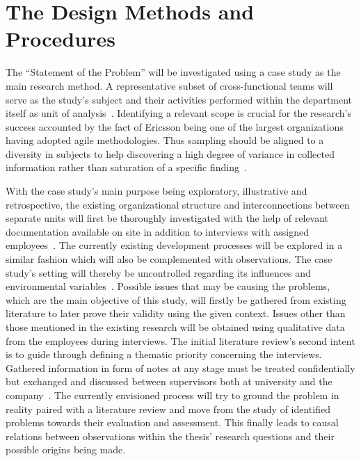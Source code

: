 \documentclass[paper=a4, fontsize=11pt]{scrartcl}
\numberwithin{equation}{section}		%
\numberwithin{figure}{section}			%
\numberwithin{table}{section}			%
\newcommand{\quotes}[1]{``#1''}
\begin{document}
\section{The Design \textemdash Methods and Procedures}

The \quotes{Statement of the Problem} will be investigated using a case study as the main research method. A representative subset of cross-functional teams will serve as the study's subject and their activities performed within the department itself as unit of analysis~\citep{thomas2011casestudy}. Identifying a relevant scope is crucial for the research's success accounted by the fact of Ericsson being one of the largest organizations having adopted agile methodologies. Thus sampling should be aligned to a diversity in subjects to help discovering a high degree of variance in collected information rather than saturation of a specific finding~\citep{vandeven2007socialresearch}.

With the case study's main purpose being exploratory, illustrative and retrospective, the existing organizational structure and interconnections between separate units will first be thoroughly investigated with the help of relevant documentation available on site in addition to interviews with assigned employees~\citep{thomas2011casestudy}. The currently existing development processes will be explored in a similar fashion which will also be complemented with observations. The case study's setting will thereby be uncontrolled regarding its influences and environmental variables~\citep{yin2009casestudy}.
Possible issues that may be causing the problems, which are the main objective of this study, will firstly be gathered from existing literature to later prove their validity using the given context. Issues other than those mentioned in the existing research will be obtained using qualitative data from the employees during interviews. The initial literature review's second intent is to guide through defining a thematic priority concerning the interviews. Gathered information in form of notes at any stage must be treated confidentially but exchanged and discussed between supervisors both at university and the company~\citep{yin2009casestudy}. The currently envisioned process will try to ground the problem in reality paired with a literature review and move from the study of identified problems towards their evaluation and assessment. This finally leads to causal relations between observations within the thesis' research questions and their possible origins being made.
\end{document}
